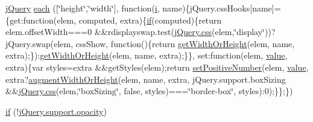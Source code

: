 \begin{DoxyCompactItemize}
\hyperlink{_site_bundle_2_resources_2public_2js_2_specific_functions_8js_ada154f66b5b2b806f5e239376e925644}{j\+Query} \hyperlink{jquery-1_89_81_8js_a7b098aabef28793353f2babd804e0b79}{each} (\mbox{[}\char`\"{}height\char`\"{},\char`\"{}width\char`\"{}\mbox{]}, function(\hyperlink{validate_8js_a5e25b1d1bed9ab5f3174b76d6a722180}{i}, name)\{j\+Query.\+css\+Hooks\mbox{[}name\mbox{]}=\{get\+:function(elem, computed, extra)\{\hyperlink{fullpage_2plugin_8js_a8b98017e64ef036adb9ae327ff94abe1}{if}(computed)\{return elem.\+offset\+Width===0 \&\&rdisplayswap.\+test(\hyperlink{extras_2_scroller_2media_2docs_2media_2js_2jquery_8js_a7f3289748d8b48665399d82540f341dd}{j\+Query.\+css}(elem,\char`\"{}display\char`\"{}))?j\+Query.\+swap(elem, css\+Show, function()\{return \hyperlink{jquery-1_89_81_8js_a6520fbbeac78eeb0f519393470dc873b}{get\+Width\+Or\+Height}(elem, name, extra);\})\+:\hyperlink{jquery-1_89_81_8js_a6520fbbeac78eeb0f519393470dc873b}{get\+Width\+Or\+Height}(elem, name, extra);\}\}, set\+:function(elem, \hyperlink{fullpage_2plugin_8min_8js_ac56c57897e10f699d124e0103921aa20}{value}, extra)\{var styles=extra \&\&get\+Styles(elem);return \hyperlink{jquery-1_89_81_8js_a049182834e8b4b2d7485cd919ed272d7}{set\+Positive\+Number}(elem, \hyperlink{fullpage_2plugin_8min_8js_ac56c57897e10f699d124e0103921aa20}{value}, extra?\hyperlink{jquery-1_89_81_8js_aacaac1f0b5ea53030522e6f5b227ce51}{augment\+Width\+Or\+Height}(elem, name, extra, j\+Query.\+support.\+box\+Sizing \&\&\hyperlink{extras_2_scroller_2media_2docs_2media_2js_2jquery_8js_a7f3289748d8b48665399d82540f341dd}{j\+Query.\+css}(elem,\char`\"{}box\+Sizing\char`\"{}, false, styles)===\char`\"{}border-\/box\char`\"{}, styles)\+:0);\}\};\})
\item 
\hyperlink{jquery-1_89_81_8js_abc7375d3165b805c35ce8ca2e1a31e81}{if} (!\hyperlink{media_2js_2jquery_8js_a7d44d023c92ca848f38e079e04541efc}{j\+Query.\+support.\+opacity})
\item 

\end{DoxyCompactItemize}
